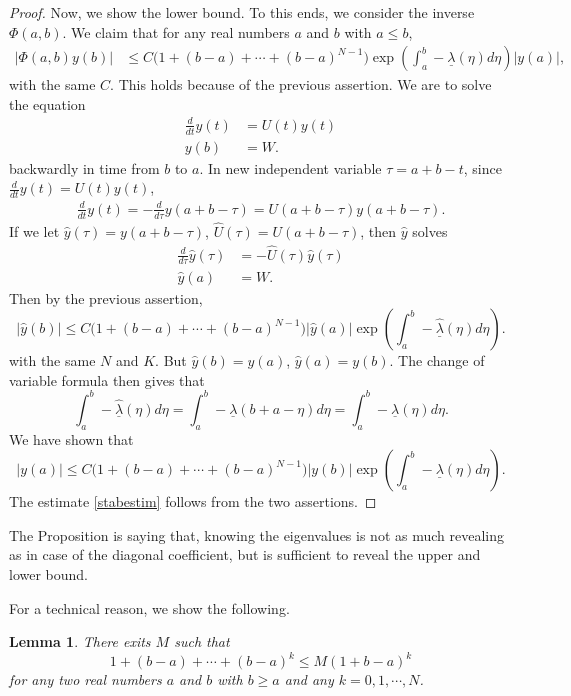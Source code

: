 \documentclass[a4paper,11pt]{article}
\newcommand{\udl}{\underline{\lambda}}
\newtheorem{lemma}{Lemma}[section]
\theoremstyle{remark}
\begin{document}
\begin{proof}
 Now, we show the lower bound. To this ends, we consider the inverse $\Phi(a,b)$. We claim that for any real numbers $a$ and $b$ with $a \le b$,
\begin{align*}
|\Phi(a,b)y(b)| &\le C \Big(1 + (b-a) + \cdots + (b-a)^{N-1}\Big)\exp\left(\int_a^b -\udl(\eta) d\eta\right)|y(a)|,\end{align*}
with the same $C$. This holds because of the previous assertion. We are to solve the equation 
  \begin{align*}
  \frac{d}{dt}{y}(t) &= {U}(t){y}(t)\\
  {y}(b) &= W.
 \end{align*}
 backwardly in time from $b$ to $a$. In new independent variable $\tau = a+b-t$, since $\frac{d}{dt}y(t)=U(t)y(t)$,
 \begin{align*}
  \frac{d}{dt}y(t)=-\frac{d}{d\tau}y(a+b-\tau) = U(a+b-\tau)y(a+b-\tau).
 \end{align*}
 If we let $\hat{y}(\tau)=y(a+b-\tau)$, $\hat{U}(\tau)=U(a+b-\tau)$, then $\hat{y}$ solves
 \begin{align*}
  \frac{d}{d\tau}\hat{y}(\tau) &= -\hat{U}(\tau)\hat{y}(\tau)\\
  \hat{y}(a) &= W.
 \end{align*}
Then by the previous assertion,
 $$|\hat{y}(b)| \le C\Big(1 + (b-a) + \cdots + (b-a)^{N-1}\Big)|\hat{y}(a)| \exp\left(\int_a^b -\hat{\udl}(\eta) d\eta\right).$$
 with the same $N$ and $K$. But $\hat{y}(b)=y(a)$, $\hat{y}(a)=y(b)$. The change of variable formula then gives that $$\int_a^b -\hat{\udl}(\eta)d\eta = \int_a^b -{\udl}(b+a-\eta)d\eta
=\int_a^b -\udl(\eta) d\eta.$$ We have shown that
$$|{y}(a)| \le C\Big(1 + (b-a) + \cdots + (b-a)^{N-1}\Big)|{y}(b)| \exp\left(\int_a^b -{\udl}(\eta) d\eta\right).$$
The estimate \eqref{stabestim} follows from the two assertions.
\end{proof}

The Proposition is saying that, knowing the eigenvalues is not as much revealing as in case of the diagonal coefficient, but is sufficient to reveal the upper and lower bound. 

For a technical reason, we show the following.
\begin{lemma}
There exits $M$ such that
$$1 + (b-a) + \cdots + (b-a)^{k} \le {M}(1+b-a)^k$$
for any two real numbers $a$ and $b$ with $b\ge a$ and any $k=0,1, \cdots,N$.
\end{lemma}
\end{document}
